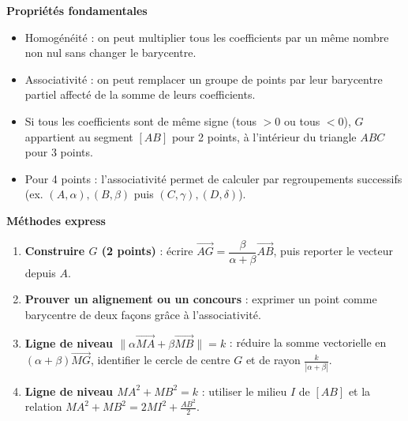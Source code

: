 \documentclass[11pt]{article}
\newcommand{\cle}[1]{{\popxbold\color{popdark}#1}}
\begin{document}
\begin{aretenir}
\textbf{Propriétés fondamentales}
\begin{itemize}
  \item \cle{Homogénéité} : on peut multiplier tous les coefficients par un même nombre non nul sans changer le barycentre.
  \item \cle{Associativité} : on peut remplacer un groupe de points par leur barycentre partiel affecté de la somme de leurs coefficients.
  \item Si tous les coefficients sont de même signe (tous $>0$ ou tous $<0$), $G$ appartient au segment $[AB]$ pour 2 points, à l'intérieur du triangle $ABC$ pour 3 points.
  \item Pour 4 points : l'associativité permet de calculer par regroupements successifs (ex. $(A,\alpha),(B,\beta)$ puis $(C,\gamma),(D,\delta)$).
\end{itemize}

\textbf{Méthodes express}
\begin{enumerate}
  \item \textbf{Construire $G$ (2 points)} : écrire $\overrightarrow{AG}=\dfrac{\beta}{\alpha+\beta}\overrightarrow{AB}$, puis reporter le vecteur depuis $A$.
  \item \textbf{Prouver un alignement ou un concours} : exprimer un point comme barycentre de deux façons grâce à l'associativité.
  \item \textbf{Ligne de niveau $\|\alpha\overrightarrow{MA}+\beta\overrightarrow{MB}\|=k$} : réduire la somme vectorielle en $(\alpha+\beta)\overrightarrow{MG}$, identifier le cercle de centre $G$ et de rayon $\frac{k}{|\alpha+\beta|}$.
  \item \textbf{Ligne de niveau $MA^2+MB^2=k$} : utiliser le milieu $I$ de $[AB]$ et la relation $MA^2+MB^2=2MI^2+\frac{AB^2}{2}$.
\end{enumerate}
\end{aretenir}
\end{document}
